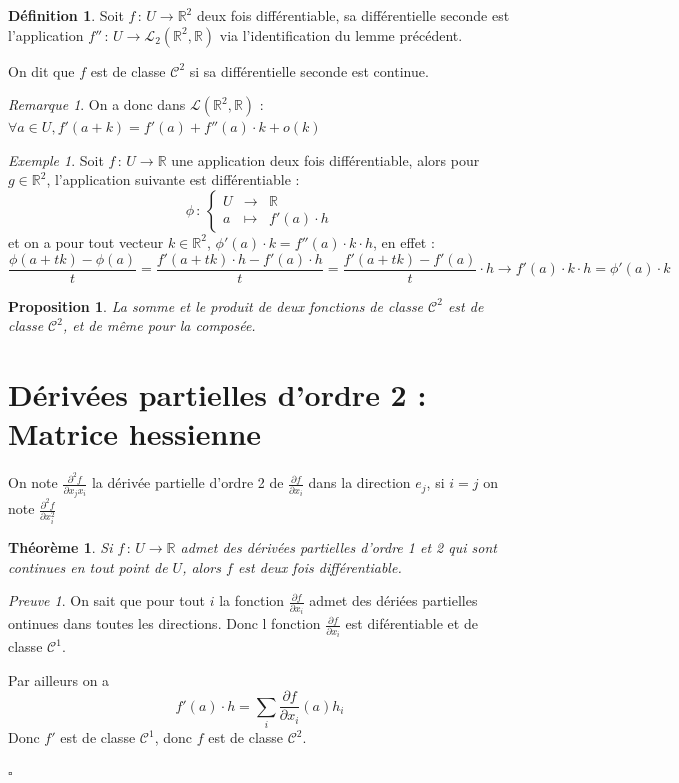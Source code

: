 \documentclass[]{article}
\newtheorem{mythm}{Théorème}
\newtheorem{myproposition}{Proposition}
\theoremstyle{remark}
\newtheorem{myrem}{Remarque}
\newtheorem{myproof}{Preuve}
\newtheorem{myexmpl}{Exemple}
\theoremstyle{definition}
\newtheorem{mydef}{Définition}
\newcommand{\cqfd}{
	\hfill$\square$
}
\newcommand{\func}[5]{
#1 \, : \, \left\{ \begin{array}{lcl}
	#2 & \longrightarrow & #3 \\
	#4 & \longmapsto & #5
\end{array}
\right.
}
\newcommand{\funcshort}[3]{
#1 \, : \, #2 \longrightarrow #3
}
\begin{document}
\begin{mydef}
	Soit $\funcshort{f}{U}{\mathbb{R}^2}$ deux fois différentiable, sa différentielle seconde est l'application $\funcshort{f''}{U}{\mathcal{L}_2(\mathbb{R}^2, \mathbb{R})}$ via l'identification du lemme précédent.
	
	On dit que $f$ est de classe $\mathcal{C}^2$ si sa différentielle seconde est continue.
\end{mydef}

\begin{myrem}
	On a donc dans $\mathcal{L}(\mathbb{R}^2, \mathbb{R})$ : $\forall a \in U, f'(a+k) = f'(a) + f''(a) \cdot k + o(k)$
\end{myrem}

\begin{myexmpl}
	Soit $\funcshort{f}{U}{\mathbb{R}}$ une application deux fois différentiable, alors pour $g \in \mathbb{R}^2$, l'application suivante est différentiable :
	$$\func{\phi}{U}{\mathbb{R}}{a}{f'(a) \cdot h}$$
	et on a pour tout vecteur $k \in \mathbb{R}^2$, $\phi'(a) \cdot k = f''(a) \cdot k \cdot h$, en effet :
	$$\frac{\phi(a + t k) - \phi(a)}{t} = \frac{f'(a + t k) \cdot h - f'(a) \cdot h}{t} = \frac{f'(a+tk) - f'(a)}{t} \cdot h \longrightarrow f'(a) \cdot k \cdot h = \phi'(a) \cdot k$$
\end{myexmpl}

\begin{myproposition}
	La somme et le produit de deux fonctions de classe $\mathcal{C}^2$ est de classe $\mathcal{C}^2$, et de même pour la composée.
\end{myproposition}

\section{Dérivées partielles d'ordre 2 : Matrice hessienne}

On note $\displaystyle \frac{\partial^2 f}{\partial x_j x_i}$ la dérivée partielle d'ordre 2 de $\displaystyle \frac{\partial f}{\partial x_i}$ dans la direction $e_j$, si $i = j$ on note $\displaystyle \frac{\partial^2 f}{\partial x_i^2}$

\begin{mythm}
	Si $\funcshort{f}{U}{\mathbb{R}}$ admet des dérivées partielles d'ordre 1 et 2 qui sont continues en tout point de $U$, alors $f$ est deux fois différentiable.
\end{mythm}

\begin{myproof}
	On sait que pour tout $i$ la fonction $\displaystyle \frac{\partial f}{\partial x_i}$ admet des dériées partielles ontinues dans toutes les directions. Donc l fonction $\displaystyle \frac{\partial f}{\partial x_i}$ est diférentiable et de classe $\mathcal{C}^1$.
	
	Par ailleurs on a $$f'(a) \cdot h = \sum_i \frac{\partial f}{\partial x_i} (a) h_i$$ Donc $f'$ est de classe $\mathcal{C}^1$, donc $f$ est de classe $\mathcal{C}^2$.

	\cqfd
\end{myproof}
\end{document}
